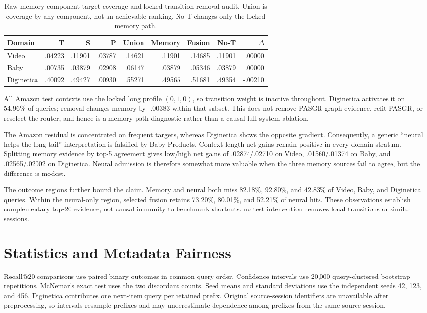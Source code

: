 \documentclass[runningheads]{llncs}
\begin{document}
\clearpage
\begin{table}[H]
\caption{Raw memory-component target coverage and locked transition-removal
audit. Union is coverage by any component, not an achievable ranking. No-T
changes only the locked memory path.}
\centering\scriptsize
\begin{tabular}{lrrrrrrrr}
\toprule
Domain & T & S & P & Union & Memory & Fusion & No-T & $\Delta$\\
\midrule
Video & .04223 & .11901 & .03787 & .14621 & .11901 & .14685 & .11901 & .00000\\
Baby & .00735 & .03879 & .02908 & .06147 & .03879 & .05346 & .03879 & .00000\\
Diginetica & .40092 & .49427 & .00930 & .55271 & .49565 & .51681 & .49354 & -.00210\\
\bottomrule
\end{tabular}
\end{table}
All Amazon test contexts use the locked long profile $(0,1,0)$, so transition
weight is inactive throughout. Diginetica activates it on 54.96\% of queries;
removal changes memory by -.00383 within that subset. This does not remove
PASGR graph evidence, refit PASGR, or reselect the router, and hence is a
memory-path diagnostic rather than a causal full-system ablation.

The Amazon residual is concentrated on frequent targets, whereas Diginetica
shows the opposite gradient. Consequently, a generic ``neural helps the
long tail'' interpretation is falsified by Baby Products. Context-length
net gains remain positive in every domain stratum. Splitting memory evidence
by top-5 agreement gives low/high net gains of .02874/.02710 on Video,
.01560/.01374 on Baby, and .02565/.02002 on Diginetica. Neural admission is
therefore somewhat more valuable when the three memory sources fail to agree,
but the difference is modest.

The outcome regions further bound the claim. Memory and neural both miss
82.18\%, 92.80\%, and 42.83\% of Video, Baby, and Diginetica queries. Within
the neural-only region, selected fusion retains 73.20\%, 80.01\%, and 52.21\%
of neural hits. These observations establish complementary top-20 evidence,
not causal immunity to benchmark shortcuts: no test intervention removes
local transitions or similar sessions.

\section{Statistics and Metadata Fairness}
Recall@20 comparisons use paired binary outcomes in common query order.
Confidence intervals use 20,000 query-clustered bootstrap repetitions.
McNemar's exact test uses the two discordant counts. Seed means and standard
deviations use the independent seeds 42, 123, and 456. Diginetica contributes
one next-item query per retained prefix. Original source-session identifiers
are unavailable after preprocessing, so intervals resample prefixes and may
underestimate dependence among prefixes from the same source session.
\end{document}
